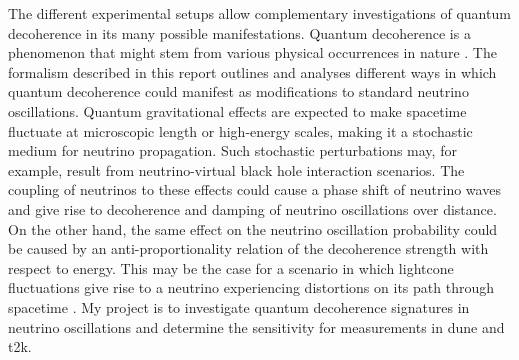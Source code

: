 The different experimental setups allow complementary investigations of quantum decoherence in its many possible manifestations. Quantum decoherence is a phenomenon that might stem from various physical occurrences in nature \cite{Farzan:2008zv}. The formalism described in this report outlines and analyses different ways in which quantum decoherence could manifest as modifications to standard neutrino oscillations. Quantum gravitational effects are expected to make spacetime fluctuate at microscopic length or high-energy scales, making it a stochastic medium for neutrino propagation. Such stochastic perturbations may, for example, result from neutrino-virtual black hole interaction scenarios. The coupling of neutrinos to these effects could cause a phase shift of neutrino waves and give rise to decoherence and damping of neutrino oscillations over distance. On the other hand, the same effect on the neutrino oscillation probability could be caused by an anti-proportionality relation of the decoherence strength with respect to energy. This may be the case for a scenario in which lightcone fluctuations give rise to a neutrino experiencing distortions on its path through spacetime \cite{Stuttard:2021uyw}. My project is to investigate  quantum decoherence signatures in neutrino oscillations and determine the sensitivity for measurements in \acrshort{dune} and \acrshort{t2k}.

